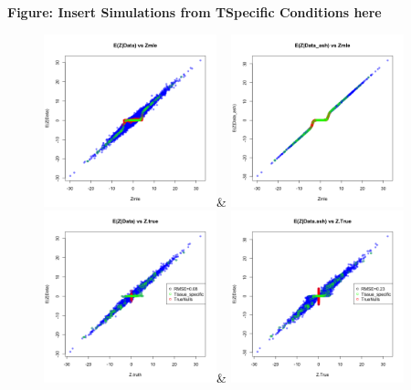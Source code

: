 {\textbf{Figure: Insert Simulations from TSpecific Conditions here}
\begin{figure}[htbp]
\includegraphics[width=5cm]{Figures/scatterplot_fittedtspec.png}&
\includegraphics[width=5cm]{Figures/scatterplot_fittedtspec_ash.png}\\
\hfill
\includegraphics[width=5cm]{Figures/scatterplot_truthtspec.png}&
\includegraphics[width=5cm]{Figures/scatterplot_TRUTHashtspec.png}
\end{figure}\newline





}
